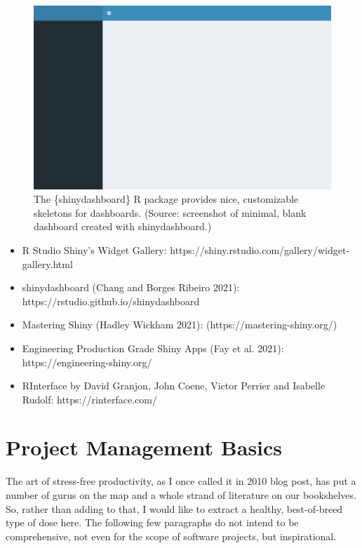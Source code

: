 \documentclass[
  12pt,
  letterpaper,
]{krantz}
\begin{document}
\begin{figure}

{\centering \includegraphics{./images/blank_dashboard.png}

}

\caption{The \{shinydashboard\} R package provides nice, customizable
skeletons for dashboards. (Source: screenshot of minimal, blank
dashboard created with shinydashboard.)}

\end{figure}

\begin{itemize}
\item
  R Studio Shiny's Widget Gallery:
  https://shiny.rstudio.com/gallery/widget-gallery.html
\item
  shinydashboard (Chang and Borges Ribeiro 2021):
  https://rstudio.github.io/shinydashboard
\item
  Mastering Shiny (Hadley Wickham 2021): (https://mastering-shiny.org/)
\item
  Engineering Production Grade Shiny Apps (Fay et al. 2021):
  https://engineering-shiny.org/
\item
  RInterface by David Granjon, John Coene, Victor Perrier and Isabelle
  Rudolf: https://rinterface.com/
\end{itemize}

\hypertarget{project-management-basics}{%
\section{\texorpdfstring{Project Management
Basics}{Project Management Basics}}\label{project-management-basics}}

The art of stress-free productivity, as I once called it in 2010 blog
post, has put a number of gurus on the map and a whole strand of
literature on our bookshelves. So, rather than adding to that, I would
like to extract a healthy, best-of-breed type of dose here. The
following few paragraphs do not intend to be comprehensive, not even for
the scope of software projects, but inspirational.
\end{document}
